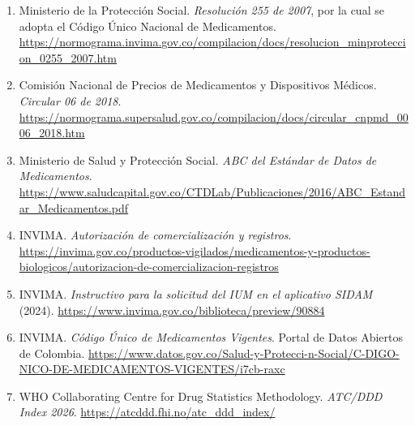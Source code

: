 \documentclass[10pt,twoside,xcolor=table,x11anmes]{IEEEtran}
\begin{document}
\begin{enumerate}
   
  \item Ministerio de la Protección Social. \textit{Resolución 255 de 2007}, por la cual se adopta el Código Único Nacional de Medicamentos. \url{https://normograma.invima.gov.co/compilacion/docs/resolucion_minproteccion_0255_2007.htm}

  \item Comisión Nacional de Precios de Medicamentos y Dispositivos Médicos. \textit{Circular 06 de 2018}. \url{https://normograma.supersalud.gov.co/compilacion/docs/circular_cnpmd_0006_2018.htm}

  \item Ministerio de Salud y Protección Social. \textit{ABC del Estándar de Datos de Medicamentos}. \url{https://www.saludcapital.gov.co/CTDLab/Publicaciones/2016/ABC_Estandar_Medicamentos.pdf}

  \item INVIMA. \textit{Autorización de comercialización y registros}. \url{https://invima.gov.co/productos-vigilados/medicamentos-y-productos-biologicos/autorizacion-de-comercializacion-registros}

  \item INVIMA. \textit{Instructivo para la solicitud del IUM en el aplicativo SIDAM} (2024). \url{https://www.invima.gov.co/biblioteca/preview/90884}

  \item INVIMA. \textit{Código Único de Medicamentos Vigentes}. Portal de Datos Abiertos de Colombia. \url{https://www.datos.gov.co/Salud-y-Protecci-n-Social/C-DIGO-NICO-DE-MEDICAMENTOS-VIGENTES/i7cb-raxc}


  \item WHO Collaborating Centre for Drug Statistics Methodology. \textit{ATC/DDD Index 2026}. \url{https://atcddd.fhi.no/atc_ddd_index/}


\end{enumerate}
\end{document}
